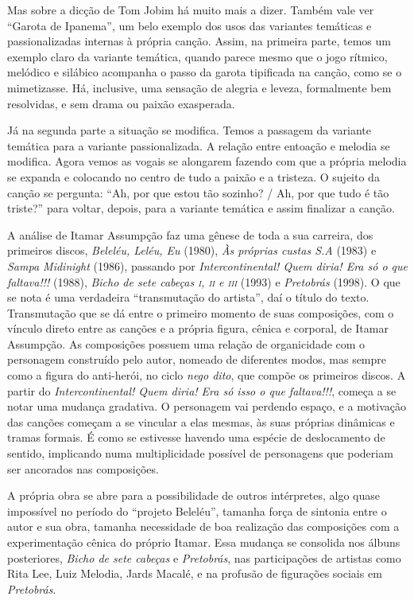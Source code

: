 Mas sobre a dicção de Tom Jobim há muito mais a dizer. Também vale ver
``Garota de Ipanema'', um belo exemplo dos usos das variantes temáticas e
passionalizadas internas à própria canção. Assim, na primeira parte,
temos um exemplo claro da variante temática, quando parece mesmo que o
jogo rítmico, melódico e silábico acompanha o passo da garota tipificada
na canção, como se o mimetizasse. Há, inclusive, uma sensação de alegria
e leveza, formalmente bem resolvidas, e sem drama ou paixão exasperada.

Já na segunda parte a situação se modifica. Temos a passagem da variante
temática para a variante passionalizada. A relação entre entoação e
melodia se modifica. Agora vemos as vogais se alongarem fazendo com que
a própria melodia se expanda e colocando no centro de tudo a paixão e a
tristeza. O sujeito da canção se pergunta: ``Ah, por que estou tão
sozinho? / Ah, por que tudo é tão triste?'' para voltar, depois, para a
variante temática e assim finalizar a canção.

A análise de Itamar Assumpção faz uma gênese de toda a sua carreira, dos
primeiros discos, \textit{Beleléu, Leléu, Eu} (1980), \textit{Às próprias custas \textsc{S.A}}
(1983) e \textit{Sampa Midinight} (1986), passando por \textit{Intercontinental! Quem
diria! Era só o que faltava!!!} (1988), \textit{Bicho de sete cabeças \textsc{i}, \textsc{ii} e \textsc{iii}}
(1993) e \textit{Pretobrás} (1998). O que se nota é uma verdadeira ``transmutação
do artista'', daí o título do texto. Transmutação que se dá entre o
primeiro momento de suas composições, com o vínculo direto entre as
canções e a própria figura, cênica e corporal, de Itamar Assumpção. As
composições possuem uma relação de organicidade com o personagem
construído pelo autor, nomeado de diferentes modos, mas sempre como a
figura do anti-herói, no ciclo \textit{nego dito}, que compõe os primeiros
discos. A partir do \textit{Intercontinental! Quem diria! Era só isso o que
faltava!!!}, começa a se notar uma mudança gradativa. O personagem vai
perdendo espaço, e a motivação das canções começam a se vincular a elas
mesmas, às suas próprias dinâmicas e tramas formais. É como se estivesse
havendo uma espécie de deslocamento de sentido, implicando numa
multiplicidade possível de personagens que poderiam ser ancorados nas
composições.

A própria obra se abre para a possibilidade de outros intérpretes, algo
quase impossível no período do ``projeto Beleléu'', tamanha força de
sintonia entre o autor e sua obra, tamanha necessidade de boa realização
das composições com a experimentação cênica do próprio Itamar. Essa
mudança se consolida nos álbuns posteriores, \textit{Bicho de sete cabeças} e
\textit{Pretobrás}, nas participações de artistas como Rita Lee, Luiz
Melodia, Jards Macalé, e na profusão de figurações sociais em \textit{Pretobrás}.

